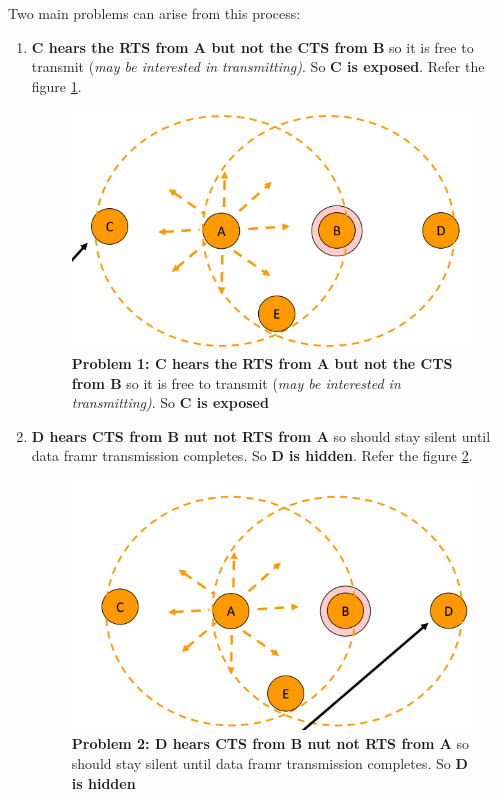 \documentclass[10pt,a4paper]{report}
\theoremstyle{definition}
\begin{document}
Two main problems can arise from this process:
\begin{enumerate}
	\item 
	\textbf{C hears the RTS from A but not the CTS from B} so it is free to transmit (\textit{may be interested in transmitting)}. So \textbf{C is exposed}. Refer the figure \ref{c-exposed}.
	\begin{figure}[h!]
		\centering\includegraphics[scale=0.50]{images/Pasted image 20230225102559.png}
		\caption{\textbf{Problem 1: C hears the RTS from A but not the CTS from B} so it is free to transmit (\textit{may be interested in transmitting)}. So \textbf{C is exposed}}
		\label{c-exposed}	
\end{figure}
	
	\item 
	\textbf{D hears CTS from B nut not RTS from A} so should stay silent until data framr transmission completes. So \textbf{D is hidden}. Refer the figure \ref{d-hidden}.
	\begin{figure}[h!]
		\centering\includegraphics[scale=0.50]{images/Pasted image 20230225102614.png}
		\caption{\textbf{Problem 2: D hears CTS from B nut not RTS from A} so should stay silent until data framr transmission completes. So \textbf{D is hidden}}
	\label{d-hidden}
\end{figure}
	
\end{enumerate}
\end{document}
